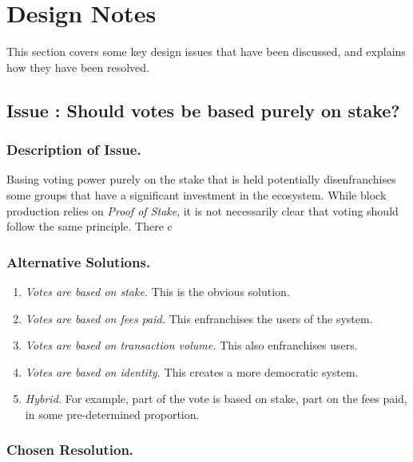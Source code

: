 \pagebreak
\section*{Design Notes}

This section covers some key design issues that have been discussed, and explains how they have been resolved.


\subsection*{Issue \theissue{}: Should votes be based purely on stake?}

\subsubsection*{Description of Issue.}

Basing voting power purely on the stake that is held potentially disenfranchises some groups that have a
significant investment in the ecosystem.  While block production relies on \emph{Proof of Stake},
it is not necessarily clear that voting should follow the same principle.  There c

\subsubsection*{Alternative Solutions.}

\begin{enumerate}
\item
  \emph{Votes are based on stake.}  This is the obvious solution.
\item
  \emph{Votes are based on fees paid.}  This enfranchises the users of the system.
\item
  \emph{Votes are based on transaction volume.}  This also enfranchises users.
\item
  \emph{Votes are based on identity.}  This creates a more democratic system.
\item
  \emph{Hybrid.}  For example, part of the vote is based on stake, part on the fees paid, in some pre-determined proportion.
\end{enumerate}

\subsubsection*{Chosen Resolution.}

